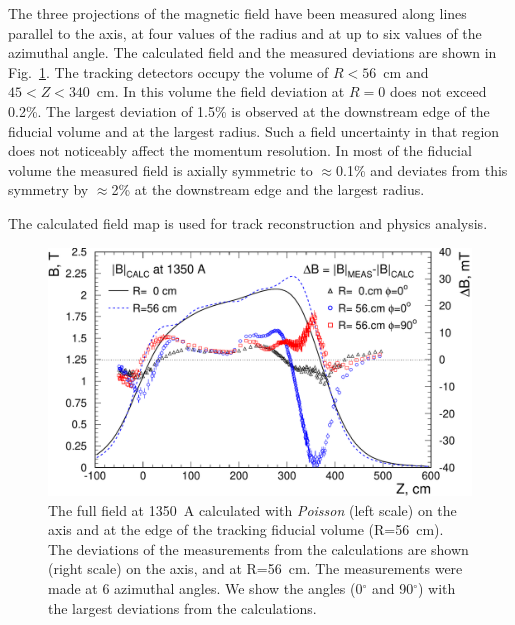 The three projections of the magnetic field have been measured along lines
parallel to the axis, at four values of the radius and at up to six values
of the azimuthal angle. The calculated field and the measured deviations are shown in Fig.~\ref{fig:sol:field_comparison}. The
tracking detectors occupy the volume of $R<56$~cm and $45<Z<340$~cm. In
this volume the field deviation at $R=0$ does not exceed 0.2\%. The
largest deviation of 1.5\% is observed at the downstream edge of the
fiducial volume and at the largest radius. Such a field uncertainty in
that region does not noticeably affect the momentum resolution. In
most of the fiducial volume the measured field is axially symmetric to
$\approx$0.1\% and deviates from this symmetry by $\approx$2\% at the
downstream edge and the largest radius.

The calculated field map is used for track reconstruction and
physics analysis.
   

\begin{figure}[!htb]
  \begin{center}
     \includegraphics[angle=0,width=1.0\linewidth]{figures/solenoid_field_calc-meas_comparison_7_1_01}%
  \end{center}
  \caption{
    The full field at 1350~A calculated with {\it Poisson} (left
    scale) on the axis and at the edge of the tracking fiducial volume (R=56~cm). The deviations of the measurements from the
    calculations are shown (right scale) on the axis, and at R=56~cm. The measurements were made at 6 azimuthal
    angles. We show the angles (0$^\circ$ and 90$^\circ$) with the largest deviations from the
    calculations.
    \label{fig:sol:field_comparison}
  }
\end{figure}


